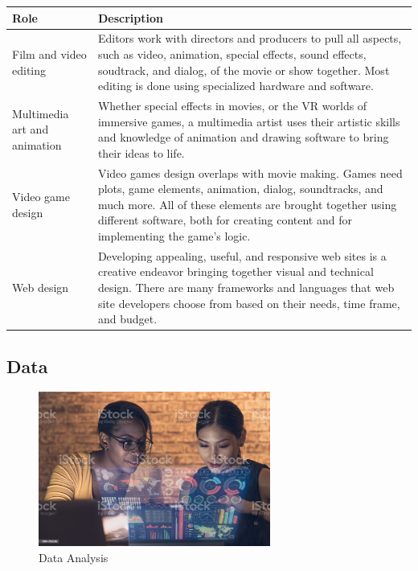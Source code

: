 \begin{table}[H]
	\begin{center}
		\begin{tabular}{p{1in}|p{3.4in}} 
			\textbf{Role} & \textbf{Description}\\
			\hline
			Film and video editing & Editors work with directors and producers to pull all aspects, such as video, animation, special effects, sound effects, soudtrack, and dialog, of the movie or show together. Most editing is done using specialized hardware and software.\\
			\hline
			Multimedia art and animation & Whether special effects in movies, or the VR worlds of immersive games, a multimedia artist uses their artistic skills and knowledge of animation and drawing software to bring their ideas to life.\\
			\hline
			Video game design & Video games design overlaps with movie making. Games need plots, game elements, animation, dialog, soundtracks, and much more. All of these elements are brought together using different software, both for creating content and for implementing the game's logic.\\
			\hline
			Web design & Developing appealing, useful, and responsive web sites is a creative endeavor bringing together visual and technical design. There are many frameworks and languages that web site developers choose from based on their needs, time frame, and budget.\\
			\hline
		\end{tabular}
	\end{center}
\end{table}


\subsection{Data}

\begin{figure}[H]
	\begin{center}
		\caption{Data Analysis}
		\vskip 4pt
		\includegraphics[height=2in]{images/careers/istockphoto-1364769258-1024x1024.jpg}
	\end{center}
\end{figure}

